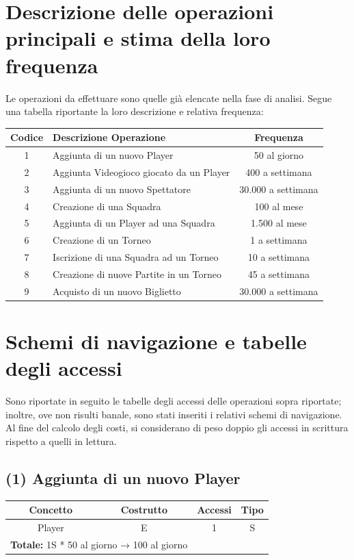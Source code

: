 \documentclass[a4paper,12pt]{report}
\begin{document}
\section{Descrizione delle operazioni principali e stima della loro frequenza}
Le operazioni da effettuare sono quelle già elencate nella fase di analisi. Segue una tabella
riportante la loro descrizione e relativa frequenza:
\begin{center}
	\begin{tabular}{|c|m{8cm}|c|}
		\hline\rowcolor{pink}
		Codice & Descrizione Operazione & Frequenza\\
		\hline\hline
		1 & Aggiunta di un nuovo Player & 50 al giorno\\ 
		\hline	
		2 & Aggiunta Videogioco giocato da un Player & 400 a settimana \\
		\hline
		3 & Aggiunta di un nuovo Spettatore & 30.000 a settimana \\
		\hline
		4 & Creazione di una Squadra & 100 al mese\\
		\hline 
		5 & Aggiunta di un Player ad una Squadra & 1.500 al mese\\ 
		\hline
		6 & Creazione di un Torneo & 1 a settimana\\ 
		\hline
		7 & Iscrizione di una Squadra ad un Torneo & 10 a settimana\\ 
		\hline
		8 & Creazione di nuove Partite in un Torneo & 45 a settimana\\ 
		\hline
		9 & Acquisto di un nuovo Biglietto & 30.000 a settimana\\ 
		\hline
	\end{tabular}
\end{center}
\section{Schemi di navigazione e tabelle degli accessi}
Sono riportate in seguito le tabelle degli accessi delle operazioni sopra riportate; inoltre, ove
non risulti banale, sono stati inseriti i relativi schemi di navigazione. Al fine del calcolo degli
costi, si considerano di peso doppio gli accessi in scrittura rispetto a quelli in lettura.
\renewcommand{\arraystretch}{1.15} %
\setlength{\arrayrulewidth}{0.5mm}%
\setlength{\tabcolsep}{10pt}%
\setlength\doublerulesep{0.1cm}%
\subsection*{(1) Aggiunta di un nuovo Player}
\begin{center}
	\begin{tabular}{|c|c|c|c|}
		\hline\rowcolor{pink}
		Concetto & Costrutto & Accessi & Tipo\\
		\hline\hline
		Player & E & 1 & S\\
		\hline\hline
		\multicolumn{2}{l}{
			\textbf{Totale:} 1S * 50 al giorno → 100 al giorno} \\
		\hline
	\end{tabular}
\end{center}
\end{document}
